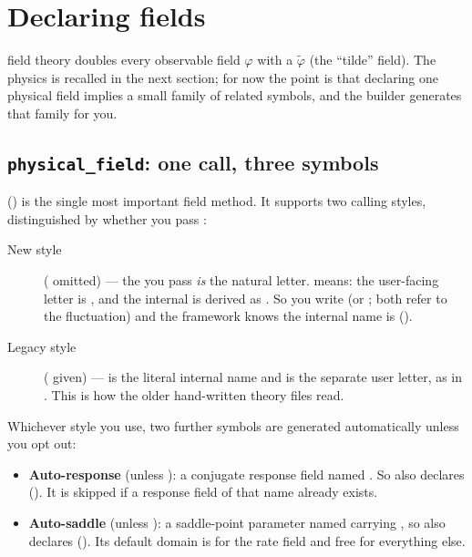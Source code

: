 \section{Declaring fields}

\msrjd{} field theory doubles every observable field $\varphi$ with a
 $\tilde\varphi$ (the ``tilde'' field). The physics is
recalled in the next section; for now the point is that declaring one physical
field implies a small family of related symbols, and the builder generates that
family for you.

\subsection{\texttt{physical\_field}: one call, three symbols}

 () is the single most
important field method. It supports two calling styles, distinguished by whether
you pass :

\begin{description}
  \item[New style] ( omitted) --- the  you pass
        \emph{is} the natural letter.  means: the
        user-facing letter is , and the internal 
        is derived as . So you write  (or ; both refer
        to the fluctuation) and the framework knows the internal name is
         ().
  \item[Legacy style] ( given) ---  is the literal
        internal name and  is the separate user letter, as in
        . This is how the older
        hand-written theory files read.
\end{description}

Whichever style you use, two further symbols are generated automatically unless
you opt out:

\begin{itemize}
  \item \textbf{Auto-response} (unless ): a conjugate
        response field named . So 
        also declares  (). It is skipped if
        a response field of that name already exists.
  \item \textbf{Auto-saddle} (unless ): a saddle-point
        parameter named  carrying , so
         also declares 
        (). Its default domain is 
        for the rate field  and free for everything else.
\end{itemize}

